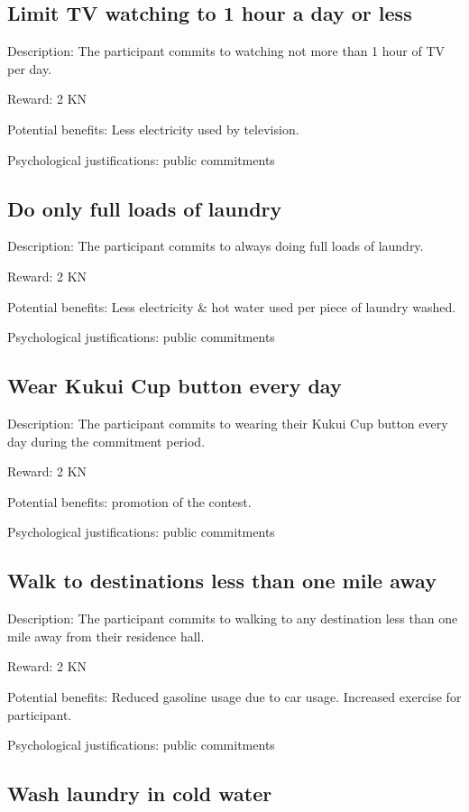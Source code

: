 \subsection{Limit TV watching to 1 hour a day or less}

Description: The participant commits to watching not more than 1 hour of TV per day.

Reward: 2 KN

Potential benefits: Less electricity used by television.

Psychological justifications: public commitments

\subsection{Do only full loads of laundry}

Description: The participant commits to always doing full loads of laundry.

Reward: 2 KN

Potential benefits: Less electricity \& hot water used per piece of laundry washed.

Psychological justifications: public commitments

\subsection{Wear Kukui Cup button every day}

Description: The participant commits to wearing their Kukui Cup button every day during the commitment period.

Reward: 2 KN

Potential benefits: promotion of the contest.

Psychological justifications: public commitments

\subsection{Walk to destinations less than one mile away}

Description: The participant commits to walking to any destination less than one mile away from their residence hall.

Reward: 2 KN

Potential benefits: Reduced gasoline usage due to car usage. Increased exercise for participant.

Psychological justifications: public commitments

\subsection{Wash laundry in cold water}

